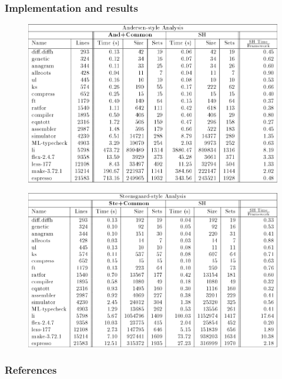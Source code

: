 \documentclass{beamer}
\begin{document}
\begin{frame}[allowframebreaks]
\frametitle{Implementation and results}

  \begin{figure}
    \centering
    \includegraphics[scale=0.3]{andersen_comparison.png}
  \end{figure}

  \begin{figure}
    \centering
    \includegraphics[scale=0.3]{steensgard_comparison.png}
  \end{figure}
\end{frame}

\begin{frame}[allowframebreaks]
  \frametitle{References}
  
  
\end{frame}
\end{document}
